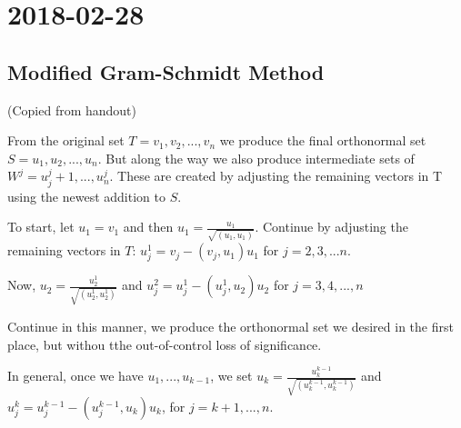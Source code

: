 \section{2018-02-28}

\subsection{Modified Gram-Schmidt Method}

(Copied from handout)

From the original set $T = {v_1, v_2, ..., v_n}$ we produce the final orthonormal set $S = {u_1, u_2, ..., u_n}$. But along the way we also produce intermediate sets of $W^j = {u^j_j+1, ..., u^j_n}$. These are created by adjusting the remaining vectors in T using the newest addition to $S$.

To start, let $u_1 = v_1$ and then $u_1 = \frac{u_1}{\sqrt{(u_1, u_1)}}$. Continue by adjusting the remaining vectors in $T$: $u^1_j = v_j - (v_j, u_1)u_1$ for $j = 2, 3, ... n$.

Now, $u_2 = \frac{u^1_2}{\sqrt{(u^1_2, u^1_2)}}$ and $u^2_j = u^1_j - (u^1_j, u_2)u_2$ for $j = 3, 4, ..., n$

Continue in this manner, we produce the orthonormal set we desired in the first place, but withou tthe out-of-control loss of significance.

In general, once we have ${u_1, ..., u_{k-1}}$, we set $u_k = \frac{u^{k-1}_k}{\sqrt{(u^{k-1}_k, u^{k-1}_k)}}$ and $u^k_j = u^{k-1}_j - (u^{k-1}_j, u_k)u_k$, for $j = k+1, ..., n$.